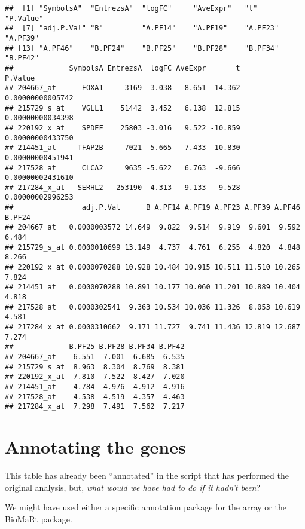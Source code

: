 \documentclass{article}\usepackage[]{graphicx}\usepackage[]{color}
\makeatletter
\newenvironment{kframe}{%
 \def\at@end@of@kframe{}%
 \ifinner\ifhmode%
  \def\at@end@of@kframe{\end{minipage}}%
  \begin{minipage}{\columnwidth}%
 \fi\fi%
 \def\FrameCommand##1{\hskip\@totalleftmargin \hskip-\fboxsep
 \colorbox{shadecolor}{##1}\hskip-\fboxsep
     \hskip-\linewidth \hskip-\@totalleftmargin \hskip\columnwidth}%
 \MakeFramed {\advance\hsize-\width
   \@totalleftmargin\z@ \linewidth\hsize
   \@setminipage}}%
 {\par\unskip\endMakeFramed%
 \at@end@of@kframe}
\newenvironment{knitrout}{}{} %
\makeatother
\begin{document}
\begin{knitrout}
\color{fgcolor}\begin{kframe}
\begin{verbatim}
##  [1] "SymbolsA"  "EntrezsA"  "logFC"     "AveExpr"   "t"         "P.Value"  
##  [7] "adj.P.Val" "B"         "A.PF14"    "A.PF19"    "A.PF23"    "A.PF39"   
## [13] "A.PF46"    "B.PF24"    "B.PF25"    "B.PF28"    "B.PF34"    "B.PF42"
##             SymbolsA EntrezsA  logFC AveExpr       t          P.Value
## 204667_at      FOXA1     3169 -3.038   8.651 -14.362 0.00000000005742
## 215729_s_at    VGLL1    51442  3.452   6.138  12.815 0.00000000034398
## 220192_x_at    SPDEF    25803 -3.016   9.522 -10.859 0.00000000433750
## 214451_at     TFAP2B     7021 -5.665   7.433 -10.830 0.00000000451941
## 217528_at      CLCA2     9635 -5.622   6.763  -9.666 0.00000002431610
## 217284_x_at   SERHL2   253190 -4.313   9.133  -9.528 0.00000002996253
##                adj.P.Val      B A.PF14 A.PF19 A.PF23 A.PF39 A.PF46 B.PF24
## 204667_at   0.0000003572 14.649  9.822  9.514  9.919  9.601  9.592  6.484
## 215729_s_at 0.0000010699 13.149  4.737  4.761  6.255  4.820  4.848  8.266
## 220192_x_at 0.0000070288 10.928 10.484 10.915 10.511 11.510 10.265  7.824
## 214451_at   0.0000070288 10.891 10.177 10.060 11.201 10.889 10.404  4.818
## 217528_at   0.0000302541  9.363 10.534 10.036 11.326  8.053 10.619  4.581
## 217284_x_at 0.0000310662  9.171 11.727  9.741 11.436 12.819 12.687  7.274
##             B.PF25 B.PF28 B.PF34 B.PF42
## 204667_at    6.551  7.001  6.685  6.535
## 215729_s_at  8.963  8.304  8.769  8.381
## 220192_x_at  7.810  7.522  8.427  7.020
## 214451_at    4.784  4.976  4.912  4.916
## 217528_at    4.538  4.519  4.357  4.463
## 217284_x_at  7.298  7.491  7.562  7.217
\end{verbatim}
\end{kframe}
\end{knitrout}

\section{Annotating the genes}

This table has already been ``annotated'' in the script that has
performed the original analysis, but, \emph{what would we have had to do if
it hadn't been}?

We might have used either a specific annotation package for the array
or the BioMaRt package.
\end{document}
